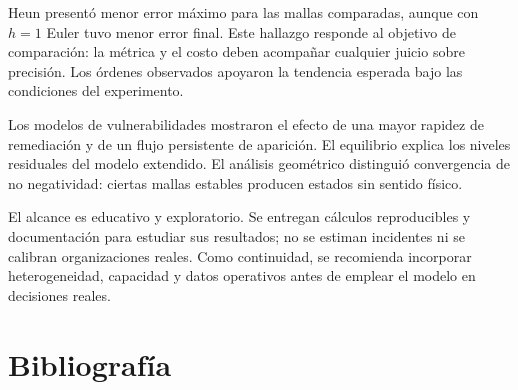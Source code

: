 \documentclass[11pt,a4paper]{article}
\begin{document}
Heun presentó menor error máximo para las mallas comparadas, aunque con $h=1$ Euler tuvo menor error final. Este hallazgo responde al objetivo de comparación: la métrica y el costo deben acompañar cualquier juicio sobre precisión. Los órdenes observados apoyaron la tendencia esperada bajo las condiciones del experimento.

Los modelos de vulnerabilidades mostraron el efecto de una mayor rapidez de remediación y de un flujo persistente de aparición. El equilibrio explica los niveles residuales del modelo extendido. El análisis geométrico distinguió convergencia de no negatividad: ciertas mallas estables producen estados sin sentido físico.

El alcance es educativo y exploratorio. Se entregan cálculos reproducibles y documentación para estudiar sus resultados; no se estiman incidentes ni se calibran organizaciones reales. Como continuidad, se recomienda incorporar heterogeneidad, capacidad y datos operativos antes de emplear el modelo en decisiones reales.

\section{Bibliografía}
\printbibliography[heading=none]
\end{document}
